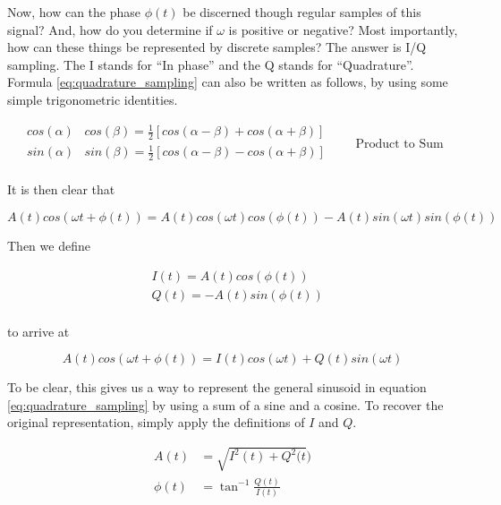 \documentclass[a4paper, 12pt]{article}
\begin{document}
Now, how can the phase $\phi(t)$ be discerned though regular samples of this signal?  And, how do you determine if $\omega$ is positive or negative?  Most importantly, how can these things be represented by discrete samples?  The answer is I/Q sampling.  The I stands for ``In phase'' and the Q stands for ``Quadrature''.  Formula \ref{eq:quadrature_sampling} can also be written as follows, by using some simple trigonometric identities.

\begin{equation}
\label{eq:trig_ident}
\begin{aligned}
  cos(\alpha)&cos(\beta) = \frac{1}{2}[cos(\alpha - \beta) + cos(\alpha + \beta)]\\
  sin(\alpha)&sin(\beta) = \frac{1}{2}[cos(\alpha - \beta) - cos(\alpha + \beta)]\\
\end{aligned}
\qquad \text{Product to Sum}
\end{equation}

It is then clear that

\begin{equation*} %
A(t)cos(\omega t + \phi (t)) = A(t)cos(\omega t)cos(\phi (t)) - 
A(t)sin(\omega t)sin(\phi(t))
\end{equation*}

Then we define

\begin{equation}
\label{eq:iq_defn}
\begin{aligned}
  &I(t) = A(t)cos(\phi (t))\\
  &Q(t) = -A(t)sin(\phi (t))\\
\end{aligned}
\end{equation}

to arrive at  

\begin{equation}
\label{eq:quadrature_sampling3}
A(t)cos(\omega t + \phi (t)) = I(t)cos(\omega t) + Q(t)sin(\omega t)
\end{equation}

To be clear, this gives us a way to represent the general sinusoid in equation \ref{eq:quadrature_sampling} by using a sum of a sine and a cosine.  To recover the original representation, simply apply the definitions of $I$ and $Q$.

\begin{equation}
\label{eq:quadrature_sampling4}
\begin{aligned}
A(t) &= \sqrt{I^2(t) + Q^2(t})\\
\phi(t) &= \tan^{-1}{\frac{Q(t)}{I(t)}}
\end{aligned}
\end{equation}
\end{document}
